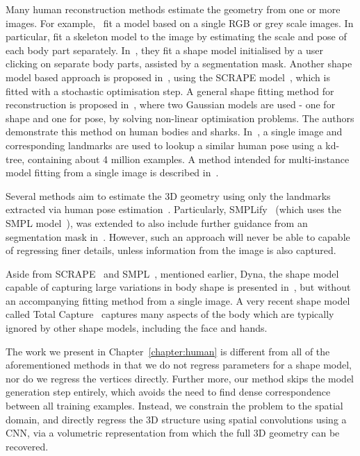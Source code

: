 Many human reconstruction methods estimate the geometry from one or
more images. For
example,~\cite{balan2007detailed,grest2005human,guan2009estimating}
fit a model based on a single RGB or grey scale images. In particular,
\cite{grest2005human} fit a skeleton model to the image by estimating
the scale and pose of each body part
separately. In~\cite{guan2009estimating}, they fit a shape model
initialised by a user clicking on separate body parts, assisted by a
segmentation mask. Another shape model based approach is proposed
in~\cite{balan2007detailed}, using the SCRAPE
model~\cite{anguelov2005scape}, which is fitted with a stochastic
optimisation step. A general shape fitting method for reconstruction
is proposed in~\cite{chen2010inferring}, where two Gaussian models are
used - one for shape and one for pose, by solving non-linear
optimisation problems. The authors demonstrate this method on human
bodies and sharks. In~\cite{jiang20103d}, a single image and
corresponding landmarks are used to lookup a similar human pose using
a kd-tree, containing about 4 million examples. A method intended for
multi-instance model fitting from a single image is described
in~\cite{Zanfir_2018_CVPR}.

Several methods aim to estimate the 3D geometry using only the
landmarks extracted via human pose
estimation~\cite{bogo2016smplify,ramakrishna2012reconstructing}. Particularly,
SMPLify~\cite{bogo2016smplify} (which uses the SMPL
model~\cite{loper2015smpl}), was extended to also include further
guidance from an segmentation mask
in~\cite{varol2017learning}. However, such an approach will never be
able to capable of regressing finer details, unless information from
the image is also captured.

Aside from SCRAPE~\cite{anguelov2005scape} and
SMPL~\cite{loper2015smpl}, mentioned earlier, Dyna, the shape model
capable of capturing large variations in body shape is presented
in~\cite{Dyna:SIGGRAPH:2015}, but without an accompanying fitting
method from a single image. A very recent shape model called Total
Capture~\cite{Joo_2018_CVPR} captures many aspects of the body which
are typically ignored by other shape models, including the face and
hands.

The work we present in Chapter~\ref{chapter:human} is different from
all of the aforementioned methods in that we do not regress parameters
for a shape model, nor do we regress the vertices directly. Further
more, our method skips the model generation step entirely, which
avoids the need to find dense correspondence between all training
examples. Instead, we constrain the problem to the spatial domain, and
directly regress the 3D structure using spatial convolutions using a
CNN, via a volumetric representation from which the full 3D geometry
can be recovered.


